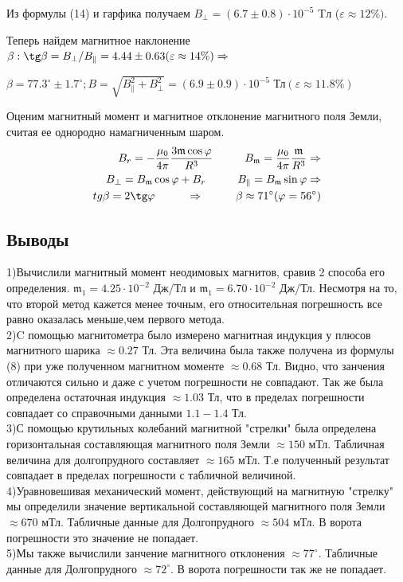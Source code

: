 \begin{center}
Из формулы (14) и гарфика получаем $B_{\perp} = (6.7\pm 0.8)\cdot 10^{-5}$ Tл ($\varepsilon\approx 12\%)$.
\end{center}
Теперь найдем магнитное наклонение $\beta:  \tg\beta = B_{\perp} / B_{\parallel} = 4.44 \pm 0.63 (\varepsilon\approx 14\%) \Rightarrow$ 
\begin{center}
$\beta = 77.3^{\circ} \pm 1.7^{\circ}; B = \sqrt{B_{\parallel}^2 + B_{\perp}^2} = (6.9 \pm 0.9)\cdot 10^{-5} \text{ Тл} (\varepsilon\approx 11.8\%)$
\end{center}

\indent
Оценим магнитный момент и магнитное отклонение магнитного поля Земли, считая ее однородно намагниченным шаром.
\begin{align}
    B_r = -\frac{\mu_0}{4\pi}\frac{3\mathfrak{m}\cos\varphi}{R^3} \hspace{1cm} 
    B_{\mathfrak{m}} = \frac{\mu_0}{4\pi}\frac{\mathfrak{m}}{R^3} \Rightarrow\\ 
    B_{\perp} = B_{\mathfrak{m}}\cos\varphi + B_r\hspace{1cm}
    B_{\parallel} = B_{\mathfrak{m}}\sin\varphi \Rightarrow\\ 
    tg\beta = 2\tg\varphi\hspace{1cm} \Rightarrow\hspace{1cm} \beta\approx 71^{\circ} (\varphi = 56^{\circ})
\end{align}

\subsection*{Выводы}
1)Вычислили магнитный момент неодимовых магнитов, сравив 2 способа его определения. 
$\mathfrak{m}_1 = 4.25\cdot 10^{-2}$ Дж/Тл и $\mathfrak{m}_1 = 6.70\cdot 10^{-2}$ Дж/Тл. Несмотря на то, что второй метод кажется менее точным, его относительная погрешность все равно оказалась меньше,чем первого метода.\\
2)C помощью магнитометра было измерено магнитная индукция у плюсов магнитного шарика $\approx 0.27$ Тл. Эта величина была также получена из формулы (8) при уже полученном магнитном моменте $\approx 0.68$ Тл. Видно, что занчения отличаются сильно и даже с учетом погрешности не совпадают. 
Так же была определена остаточная индукция $\approx 1.03$ Тл, что в пределах погрешности совпадает со справочными данными $1.1 - 1.4$ Тл.\\ 
3)С помощью крутильных колебаний магнитной "стрелки" была определена горизонтальная составляющая магнитного поля Земли $\approx 150$ мТл. Табличная величина для долгопрудного составляет $\approx 165$ мТл. Т.е полученный результат совпадает в пределах погрешности с табличной величиной.\\
4)Уравновешивая механический момент, действующий на магнитную "стрелку" мы определили значение вертикальной составляющей магнитного поля Земли $\approx 670$ мТл. Табличные данные для Долгопрудного $\approx 504$ мТл. В ворота погрешности это значение не попадает.\\
5)Мы также вычислили занчение магнитного отклонения $\approx 77^{\circ}$. Табличные данные для Долгопрудного $\approx 72^{\circ}$. В ворота погрешности так же не попадает.
